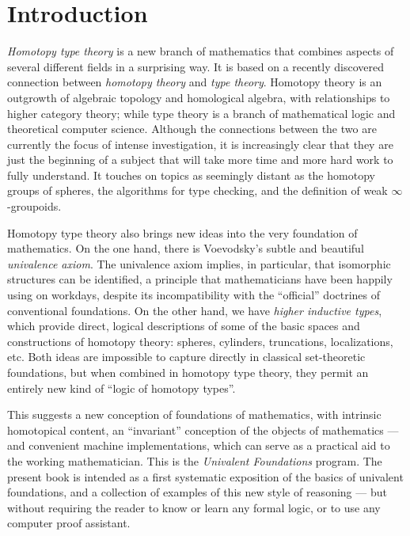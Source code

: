 \chapter*{Introduction}
\setcounter{page}{1}


\emph{Homotopy type theory} is a new branch of mathematics that combines aspects of several different fields in a surprising way. It is based on a recently discovered connection between \emph{homotopy theory} and \emph{type theory}.
Homotopy theory is an outgrowth of algebraic topology and homological algebra, with relationships to higher category theory; while type theory is a branch of mathematical logic and theoretical computer science.
Although the connections between the two are currently the focus of intense investigation, it is increasingly clear that they are just the beginning of a subject that will take more time and more hard work to fully understand.
It touches on topics as seemingly distant as the homotopy groups of spheres, the algorithms for type checking, and the definition of weak $\infty$-groupoids.

Homotopy type theory also brings new ideas into the very foundation of mathematics.
%
On the one hand, there is Voevodsky's subtle and beautiful \emph{univalence axiom}. 
%
The univalence axiom implies, in particular, that isomorphic structures can be identified, a principle that mathematicians have been happily using on workdays, despite its incompatibility with the ``official'' doctrines of conventional foundations.
On the other hand, we have \emph{higher inductive types}, which provide direct, logical descriptions of some of the basic spaces and constructions of homotopy theory: spheres, cylinders, truncations, localizations, etc.
Both ideas are impossible to capture directly in classical set-theoretic foundations, but when combined in homotopy type theory, they permit an entirely new kind of ``logic of homotopy types''.
%

This suggests a new conception of foundations of mathematics, with intrinsic homotopical content, an ``invariant'' conception of the objects of mathematics --- and convenient machine implementations, which can serve as a practical aid to the working mathematician.
This is the \emph{Univalent Foundations} program.
The present book is intended as a first systematic exposition of the basics of univalent foundations, and a collection of examples of this new style of reasoning --- but without requiring the reader to know or learn any formal logic, or to use any computer proof assistant.

